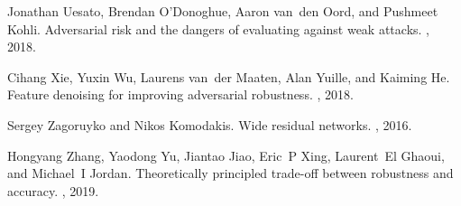 \documentclass{article}
\theoremstyle{plain}
\theoremstyle{definition}
\theoremstyle{remark}
\begin{document}
\begin{thebibliography}{10}
Jonathan Uesato, Brendan O'Donoghue, Aaron van~den Oord, and Pushmeet Kohli.
\newblock Adversarial risk and the dangers of evaluating against weak attacks.
, 2018.

Cihang Xie, Yuxin Wu, Laurens van~der Maaten, Alan Yuille, and Kaiming He.
\newblock Feature denoising for improving adversarial robustness.
, 2018.

Sergey Zagoruyko and Nikos Komodakis.
\newblock Wide residual networks.
, 2016.

Hongyang Zhang, Yaodong Yu, Jiantao Jiao, Eric~P Xing, Laurent~El Ghaoui, and
  Michael~I Jordan.
\newblock Theoretically principled trade-off between robustness and accuracy.
, 2019.

\end{thebibliography}
 \newpage
\appendix
\appendix
\end{document}
